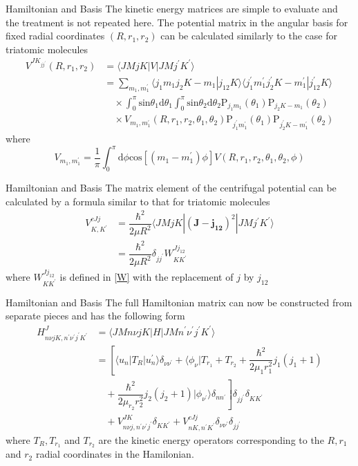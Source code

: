 \documentclass{beamer}
\begin{document}
	\begin{frame}{Hamiltonian and Basis}
		The kinetic energy matrices are simple to evaluate and the treatment is not repeated here. The potential matrix in the angular basis for fixed radial coordinates $(R,r_1,r_2)$ can be calculated similarly to the case for triatomic molecules
		\begin{align}
			V^{JK_{jj^\prime}}(R,r_1,r_2)&=\langle JMjK|V|JMj^\prime K^\prime\rangle\nonumber\\
			&=\sum\limits_{m_1,m_1^\prime}\langle j_1m_1j_2K-m_1|j_{12}K\rangle\langle j_1^\prime m_1^\prime j_2^\prime K-m_1^\prime|j_{12}^\prime K\rangle\nonumber\\
			&\quad\times \int_0^\pi \mathrm{sin}\theta_1\mathrm{d}\theta_1\int_0^\pi \mathrm{sin}\theta_2\mathrm{d}\theta_2\mathrm{P}_{j_1m_1}(\theta_1)\mathrm{P}_{j_2K-m_1}(\theta_2)\nonumber\\
			&\quad\times V_{m_1,m_1^\prime}(R,r_1,r_2,\theta_1,\theta_2)\mathrm{P}_{j_1^\prime m_1^\prime}(\theta_1)\mathrm{P}_{j_2^\prime K-m_1^\prime}(\theta_2)
		\end{align}
		where
		\begin{equation}
			V_{m_1,m_1^\prime}=\dfrac{1}{\pi}\int_0^\pi\mathrm{d}\phi\mathrm{cos}[(m_1-m_1^\prime)\phi]V(R,r_1,r_2,\theta_1,\theta_2,\phi)
		\end{equation}
	\end{frame}
	\begin{frame}{Hamiltonian and Basis}
		The matrix element of the centrifugal potential can be calculated by a formula similar to that for triatomic molecules
		\begin{align}
			V_{K,K^\prime}^{cJj}&=\dfrac{\hbar^2}{2\mu R^2}\langle JMjK|(\mathbf{J-j_{12}})^2|JMj^\prime K^\prime\rangle\nonumber\\
			&=\dfrac{\hbar^2}{2\mu R^2}\delta_{jj^\prime}W_{KK^\prime}^{Jj_{12}}
		\end{align}
		where $W_{KK^\prime}^{Jj_{12}}$ is defined in \eqref{W} with the replacement of $j$ by $j_{12}$
	\end{frame}
	\begin{frame}{Hamiltonian and Basis}
		The full Hamiltonian matrix can now be constructed from separate pieces and has the following form
		\begin{align}
			H^J_{n\nu jK,n^\prime\nu^\prime j^\prime K^\prime}&=\langle JMn\nu jK|H|JMn^\prime \nu^\prime j^\prime K^\prime\rangle\nonumber\\
			&=\left[ \langle u_n|T_R|u_n^\prime\rangle\delta_{\nu\nu^\prime}+\langle \phi_\nu|T_{r_1}+T_{r_2}+\dfrac{\hbar^2}{2\mu_1r_1^2}j_1(j_1+1)\right.\nonumber\\
			&\left.\quad+\dfrac{\hbar^2}{2\mu_{r_2}r_2^2}j_2(j_2+1)|\phi_{\nu^\prime}\rangle\delta_{nn^\prime}\right] \delta_{jj^\prime}\delta_{KK^\prime}\nonumber\\
			&\quad+V^{JK}_{n\nu j,n^\prime\nu^\prime j^\prime}\delta_{KK^\prime}+V^{cJj}_{nK,n^\prime K^\prime}\delta_{\nu\nu^\prime}\delta_{jj^\prime}
		\end{align}
		where $T_R, T_{r_1}$ and $T_{r_2}$ are the kinetic energy operators corresponding to the $R, r_1$ and $r_2$ radial coordinates in the Hamilonian.
	\end{frame}
\end{document}

